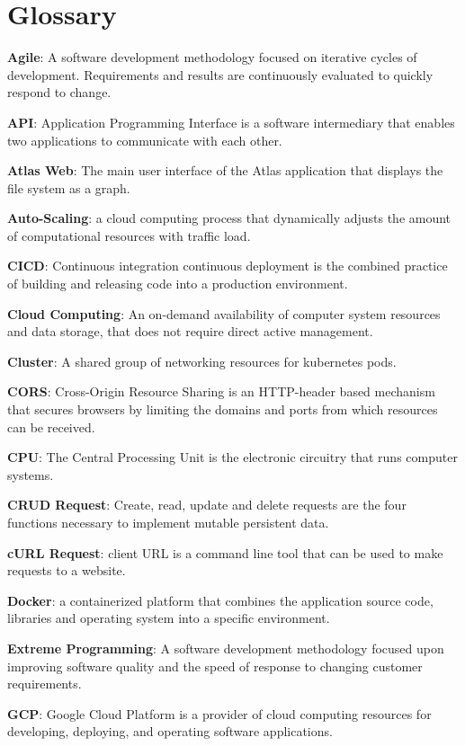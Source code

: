 \documentclass{article}
\begin{document}
\section{Glossary}
{\parindent0pt
\textbf{Agile}: A software development methodology focused on iterative cycles of development. Requirements and results are continuously evaluated to quickly respond to change.

\textbf{API}: Application Programming Interface is a software intermediary that enables two applications to communicate with each other.

\textbf{Atlas Web}: The main user interface of the Atlas application that displays the file system as a graph.

\textbf{Auto-Scaling}: a cloud computing process that dynamically adjusts the amount of computational resources with traffic load.

\textbf{CICD}: Continuous integration continuous deployment is the combined practice of building and releasing code into a production environment.

\textbf{Cloud Computing}: An on-demand availability of computer system resources and data storage, that does not require direct active management. 

\textbf{Cluster}: A shared group of networking resources for kubernetes pods.

\textbf{CORS}: Cross-Origin Resource Sharing is an HTTP-header based mechanism that secures browsers by limiting the domains and ports from which resources can be received.

\textbf{CPU}: The Central Processing Unit is the electronic circuitry that runs computer systems.

\textbf{CRUD Request}: Create, read, update and delete requests are the four functions necessary to implement mutable persistent data.

\textbf{cURL Request}: client URL is a command line tool that can be used to make requests to a website.

\textbf{Docker}: a containerized platform that combines the application source code, libraries and operating system into a specific environment.

\textbf{Extreme Programming}: A software development methodology focused upon improving software quality and the speed of response to changing customer requirements.

\textbf{GCP}: Google Cloud Platform is a provider of cloud computing resources for developing, deploying, and operating software applications.

}
\end{document}
